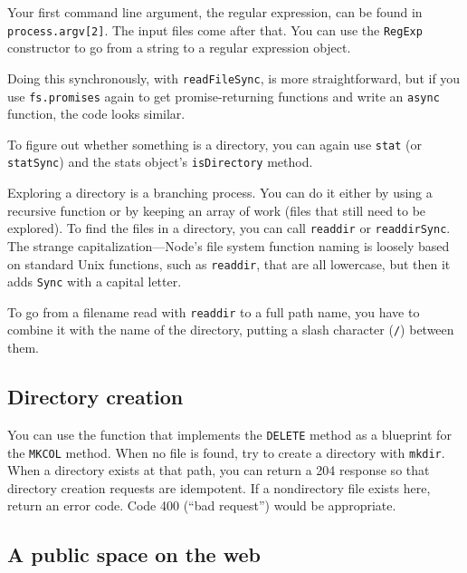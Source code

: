 Your first command line argument, the regular expression, can be found in \lstinline`process.argv[2]`. The input files come after that. You can use the \lstinline`RegExp` constructor to go from a string to a regular expression object.

Doing this synchronously, with \lstinline`readFileSync`, is more straightforward, but if you use \lstinline`fs.promises` again to get promise-returning functions and write an \lstinline`async` function, the code looks similar.

To figure out whether something is a directory, you can again use \lstinline`stat` (or \lstinline`statSync`) and the stats object's \lstinline`isDirectory` method.

Exploring a directory is a branching process. You can do it either by using a recursive function or by keeping an array of work (files that still need to be explored). To find the files in a directory, you can call \lstinline`readdir` or \lstinline`readdirSync`. The strange capitalization—Node's file system function naming is loosely based on standard Unix functions, such as \lstinline`readdir`, that are all lowercase, but then it adds \lstinline`Sync` with a capital letter.

To go from a filename read with \lstinline`readdir` to a full path name, you have to combine it with the name of the directory, putting a slash
character (\lstinline`/`) between them.

\subsection{Directory creation}

You can use the function that implements the \lstinline`DELETE` method as a blueprint for the \lstinline`MKCOL` method. When no file is found, try to create a directory with \lstinline`mkdir`. When a directory exists at that path, you can return a 204 response so that directory creation requests are idempotent. If a nondirectory file exists here, return an error code. Code 400 (``bad request'') would be appropriate.

\subsection{A public space on the web}

